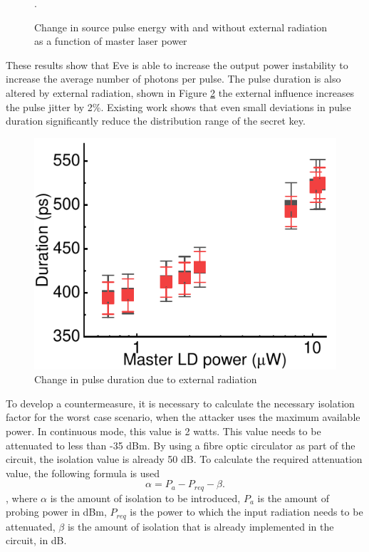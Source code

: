 {\begin{figure}
    \caption{Change in source pulse energy with and without external radiation as a function of master laser power}.
    \label{fig:area MDI syn}
\end{figure}
These results show that Eve is able to increase the output power instability to increase the average number of photons per pulse. The pulse duration is also altered by external radiation, shown in Figure \ref{fig:duration syn} the external influence increases the pulse jitter by 2\%.  Existing work shows \cite{xie2019} that even small deviations in pulse duration significantly reduce the distribution range of the secret key. 
\begin{figure}
    \centering
    \includegraphics{images/duration_change.pdf}
    \caption{Change in pulse duration due to external radiation}
    \label{fig:duration syn}
\end{figure}
\newline To develop a countermeasure, it is necessary to calculate the necessary isolation factor for the worst case scenario, when the attacker uses the maximum available power. In continuous mode, this value is 2 watts. This value needs to be attenuated to less than -35 dBm. By using a fibre optic circulator as part of the circuit, the isolation value is already 50 dB.  To calculate the required attenuation value, the following formula is used
\begin{equation}
\label{eq:isolation syn}
    \alpha = P_a - P_{req} - \beta.
\end{equation}, where $\alpha$ is the amount of isolation to be introduced, $P_a$ is the amount of probing power in dBm, $P_{req}$ is the power to which the input radiation needs to be attenuated, $\beta$ is the amount of isolation that is already implemented in the circuit, in dB. 
}
